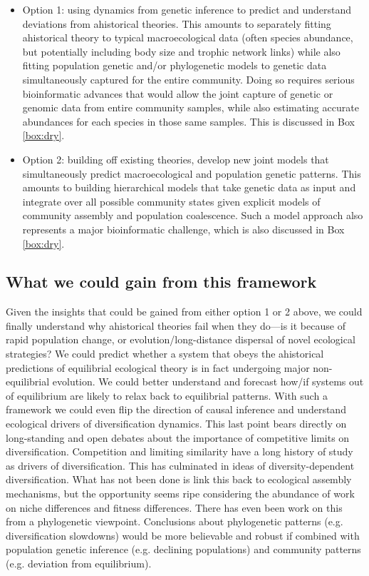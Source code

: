 \documentclass[12pt]{article}
\newcounter{Box}
\begin{document}
\begin{itemize}
\item Option 1: using dynamics from genetic inference to predict and
  understand deviations from ahistorical theories. This amounts to
  separately fitting ahistorical theory to typical macroecological
  data (often species abundance, but potentially including body size
  and trophic network links) while also fitting population genetic
  and/or phylogenetic models to genetic data simultaneously captured
  for the entire community. Doing so requires serious bioinformatic
  advances that would allow the joint capture of genetic or genomic
  data from entire community samples, while also estimating accurate
  abundances for each species in those same samples. This is discussed
  in Box \ref{box:dry}.
\item Option 2: building off existing theories, develop new joint
  models that simultaneously predict macroecological and population
  genetic patterns. This amounts to building hierarchical models that
  take genetic data as input and integrate over all possible community
  states given explicit models of community assembly and population
  coalescence. Such a model approach also represents a major
  bioinformatic challenge, which is also discussed in Box
  \ref{box:dry}.
\end{itemize}

\subsection{What we could gain from this framework}

Given the insights that could be gained from either option 1 or 2
above, we could finally understand why ahistorical theories fail when
they do---is it because of rapid population change, or
evolution/long-distance dispersal of novel ecological strategies? We
could predict whether a system that obeys the ahistorical predictions
of equilibrial ecological theory is in fact undergoing major
non-equilibrial evolution. We could better understand and forecast
how/if systems out of equilibrium are likely to relax back to
equilibrial patterns. With such a framework we could even flip the
direction of causal inference and understand ecological drivers of
diversification dynamics. This last point bears directly on
long-standing and open debates about the importance of competitive
limits on diversification. Competition and limiting similarity have a
long history of study as drivers of diversification. This has
culminated in ideas of diversity-dependent
diversification\citep{Etienne2012-ky, Rabosky2013-gk, Rabosky2008-bs}.
What has not been done is link this back to ecological assembly
mechanisms, but the opportunity seems ripe considering the abundance
of work on niche differences and fitness
differences\citep{Chesson2000-uc, Adler2007-pl, HilleRisLambers2012-xt,
  Levine2009-qj}.  There has even been work on this from a
phylogenetic viewpoint\citep{Mayfield2010-hg, Godoy2014-iv}.
Conclusions about phylogenetic patterns (e.g. diversification
slowdowns) would be more believable and robust if combined with
population genetic inference (e.g. declining populations) and
community patterns (e.g.  deviation from equilibrium).
\end{document}
